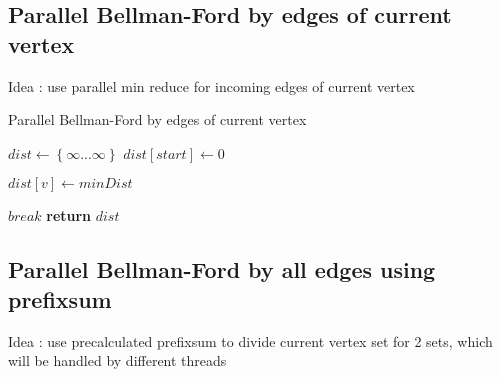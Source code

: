 \FloatBarrier
\subsection{Parallel Bellman-Ford by edges of current vertex}
Idea : use parallel min reduce for incoming edges of current vertex   


\FloatBarrier
\begin{algorithm}
\caption{Parallel Bellman-Ford by edges of current vertex}\label{bf_classic_par1}
\begin{algorithmic}[1]
\State $dist\gets \left\{ {\infty ... \infty}\right\}$
\State $dist[start] \gets 0$
 
		\algrenewcommand{}
		
			\State $dist[v] \gets minDist$
		\EndIf
		\algrenewcommand{}

	\EndFor
		\State $break$
	\EndIf
\EndFor
\State \textbf{return} $dist$
\EndProcedure
\end{algorithmic}
\end{algorithm}

\FloatBarrier
\subsection{Parallel Bellman-Ford by all edges using prefixsum}

Idea : use precalculated prefixsum to divide current vertex set for 2 sets, which will be handled by different threads



